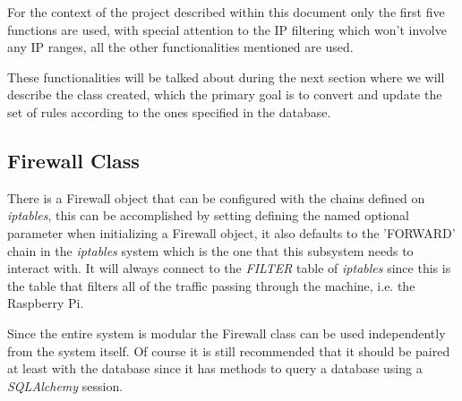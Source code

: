 For the context of the project described within this document only the first
five functions are used, with special attention to the IP filtering which won't
involve any IP ranges, all the other functionalities mentioned are used.

These functionalities will be talked about during the next section where we will
describe the class created, which the primary goal is to convert and update the
set of rules according to the ones specified in the database.

\subsection{Firewall Class}
\label{chap4:sec:firewall-sys:firewall-class}
There is a Firewall object that can be configured with the chains defined on
\emph{iptables}, this can be accomplished by setting defining the named optional
parameter when initializing a Firewall object, it also defaults to the 'FORWARD'
chain in the \emph{iptables} system which is the one that this subsystem needs
to interact with. It will always connect to the \emph{FILTER} table of
\emph{iptables} since this is the table that filters all of the traffic passing
through the machine, i.e. the Raspberry Pi.

Since the entire system is modular the Firewall class can be used independently
from the system itself. Of course it is still recommended that it should be
paired at least with the database since it has methods to query a database using
a \emph{SQLAlchemy} session.


